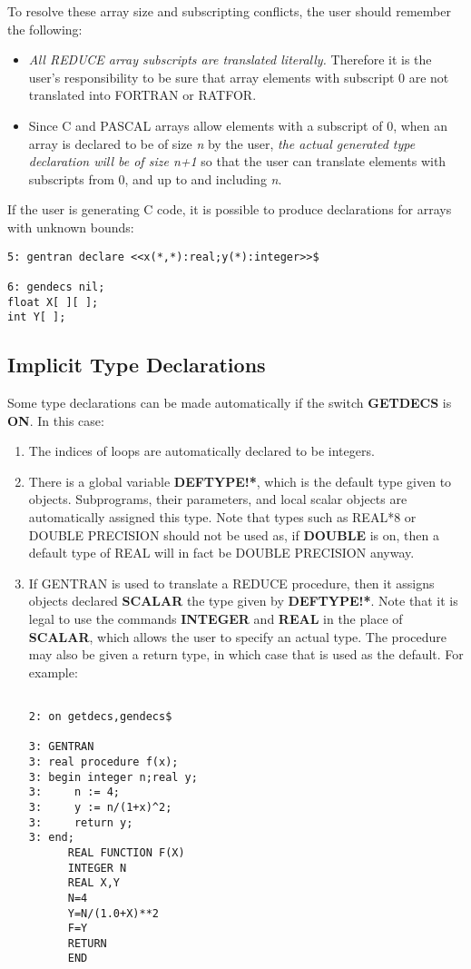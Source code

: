 To resolve these array size and subscripting conflicts, the user should
remember the following:
\begin{itemize}
\item {\it All REDUCE array subscripts are translated literally.}
Therefore it is the user's responsibility to be sure that array elements with
subscript 0 are not translated into FORTRAN or RATFOR.
\item Since C and PASCAL
arrays allow elements with a subscript of 0, when an array is
declared to be of size {\it n} by the user, {\it the actual generated type
declaration will be of size n+1} so that the user can translate
elements with subscripts from 0, and up to and including {\it n}.
\end{itemize}

If the user is generating C code, it is possible to produce declarations
for arrays with unknown bounds:
\begin{verbatim}
5: gentran declare <<x(*,*):real;y(*):integer>>$

6: gendecs nil;
float X[ ][ ];
int Y[ ];
\end{verbatim}


\subsection{Implicit Type Declarations}
\label{implicit:type} 
Some type  declarations can be made automatically if the switch {\bf GETDECS}
is {\bf ON}.  In this case:
\begin{enumerate}
\item The indices of loops are automatically declared to be integers.
\item There is a global variable {\bf DEFTYPE!*}, which is the default
type given to objects.  Subprograms, their parameters, and local scalar
objects are automatically assigned this type. 
 
Note that types such as REAL*8 or DOUBLE PRECISION should not
be used as, if {\bf DOUBLE} is on, then a default type of REAL
will in fact be DOUBLE PRECISION anyway.
\item  If GENTRAN is used to translate a REDUCE procedure, then it assigns
objects declared {\bf SCALAR} the type given by {\bf DEFTYPE!*}.  Note that
 
it is legal to use the commands {\bf INTEGER} and {\bf REAL} in the place
of {\bf SCALAR}, which allows the user to specify an actual type.  The
procedure may also be given a return type, in which case that is used as
the default.  For example:
\begin{verbatim}

2: on getdecs,gendecs$

3: GENTRAN
3: real procedure f(x);
3: begin integer n;real y;
3:     n := 4;
3:     y := n/(1+x)^2;
3:     return y;
3: end;
      REAL FUNCTION F(X)
      INTEGER N
      REAL X,Y
      N=4
      Y=N/(1.0+X)**2
      F=Y
      RETURN
      END

\end{verbatim}
\end{enumerate}

